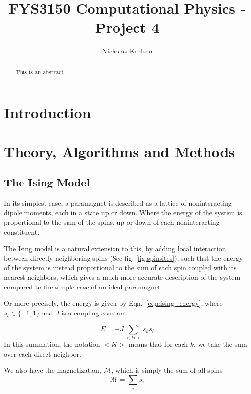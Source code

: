 \documentclass[10pt,showpacs,preprintnumbers,amsmath,amssymb,nofootinbib,aps,prl,twocolumn,groupedaddress,superscriptaddress,showkeys]{revtex4-1}
\begin{document}
\title{FYS3150 Computational Physics - Project 4}
\author{Nicholas Karlsen}


\begin{abstract}
  This is an abstract
\end{abstract}

\maketitle


\section{Introduction}
\section{Theory, Algorithms and Methods}
  \subsection{The Ising Model}
    In its simplest case, a paramagnet is described as a lattice of noninteracting dipole moments, each in a state up or down. Where the energy of the system is proportional to the sum of the spins, up or down of each noninteracting constituent.

    The Ising model is a natural extension to this, by adding local interaction between directly neighboring spins (See fig. \ref{fig:spinsites}), such that the energy of the system is instead proportional to the sum of each spin coupled with its nearest neighbors, which gives a much more accurate description of the system compared to the simple case of an ideal paramagnet.

    Or more precisely, the energy is given by Eqn.~\ref{eqn:ising_energy}, where $s_i \in \{-1, 1\}$ and $J$ is a coupling constant.

    \begin{equation}
      E = -J\sum_{<kl>} s_ks_l
      \label{eqn:ising_energy}
    \end{equation}
    In this summation, the notation $<kl>$ means that for each $k$, we take the sum over each direct neighbor.

    We also have the magnetization, $\mathcal M$, which is simply the sum of all spins
    \begin{equation*}
      \mathcal M = \sum_i s_i
    \end{equation*}
\end{document}
